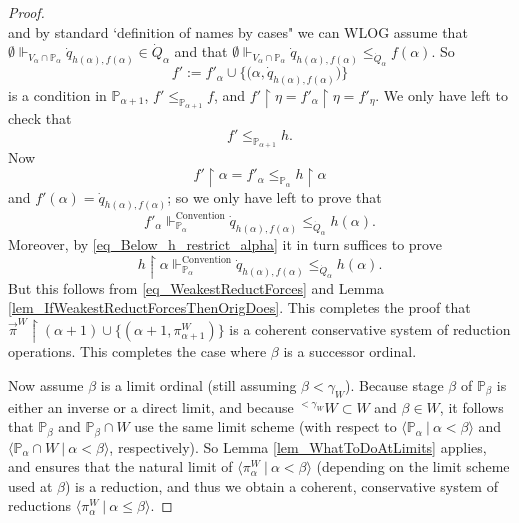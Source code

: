 \documentclass{amsart}
\begin{document}
\begin{proof}
\begin{equation}
\end{equation}
and by standard `definition of names by cases" we can WLOG assume that $\emptyset \Vdash_{V_\alpha \cap \mathbb{P}_\alpha} \dot{q}_{h(\alpha), f(\alpha)} \in \dot{Q}_\alpha$ and that $\emptyset \Vdash_{V_\alpha \cap \mathbb{P}_\alpha} \dot{q}_{h(\alpha), f(\alpha)} \le_{\dot{Q}_\alpha} f(\alpha)$.  So
\begin{equation*}
f':= f'_\alpha \cup \{ \big(\alpha, \dot{q}_{h(\alpha), f(\alpha)} \big)  \}
\end{equation*}
is a condition in $\mathbb{P}_{\alpha+1}$, $f' \le_{\mathbb{P}_{\alpha+1}} f$, and $f' \restriction \eta = f'_\alpha \restriction \eta =   f'_\eta$.  We only have left to check that
\begin{equation}\label{eq_InequalityToShow}
f' \le_{\mathbb{P}_{\alpha+1}} h.
\end{equation}
Now 
\begin{equation}\label{eq_Below_h_restrict_alpha}
f' \restriction \alpha = f'_\alpha \le_{\mathbb{P}_\alpha} h \restriction \alpha
\end{equation}
and $f'(\alpha) = \dot{q}_{h(\alpha), f(\alpha)}$; so we only have left to prove that
\begin{equation}
f'_\alpha \Vdash_{\mathbb{P}_\alpha}^{\text{Convention}} \dot{q}_{h(\alpha), f(\alpha)}   \le_{\dot{Q}_\alpha} h(\alpha).
\end{equation}
Moreover, by \eqref{eq_Below_h_restrict_alpha} it in turn suffices to prove
\begin{equation}
h \restriction \alpha \Vdash_{\mathbb{P}_\alpha}^{\text{Convention}}  \dot{q}_{h(\alpha), f(\alpha)}  \le_{\dot{Q}_\alpha} h(\alpha).
\end{equation}
But this follows from \eqref{eq_WeakestReductForces} and Lemma \ref{lem_IfWeakestReductForcesThenOrigDoes}.  This completes the proof that $\vec{\pi}^W \restriction (\alpha+1) \cup \{  (\alpha+1, \pi^W_{\alpha+1}) \}$ is a coherent conservative system of reduction operations.  This completes the case where $\beta$ is a successor ordinal.

Now assume $\beta$ is a limit ordinal (still assuming $\beta < \gamma_W$).  Because stage $\beta$ of $\mathbb{P}_\beta$ is either an inverse or a direct limit, and because ${}^{<\gamma_W} W \subset W$ and $\beta \in W$, it follows that $\mathbb{P}_\beta$ and $\mathbb{P}_\beta \cap W$ use the same limit scheme (with respect to $\langle \mathbb{P}_\alpha \ | \ \alpha < \beta \rangle$ and $\langle \mathbb{P}_\alpha \cap W \ | \ \alpha < \beta \rangle$, respectively).  So Lemma \ref{lem_WhatToDoAtLimits} applies, and ensures that the natural limit of $\langle \pi^W_\alpha \ | \ \alpha < \beta \rangle$ (depending on the limit scheme used at $\beta$) is a reduction, and thus we obtain a coherent, conservative system of reductions $\langle \pi^W_\alpha \ | \ \alpha \le \beta \rangle$.


\end{proof}
\end{document}
